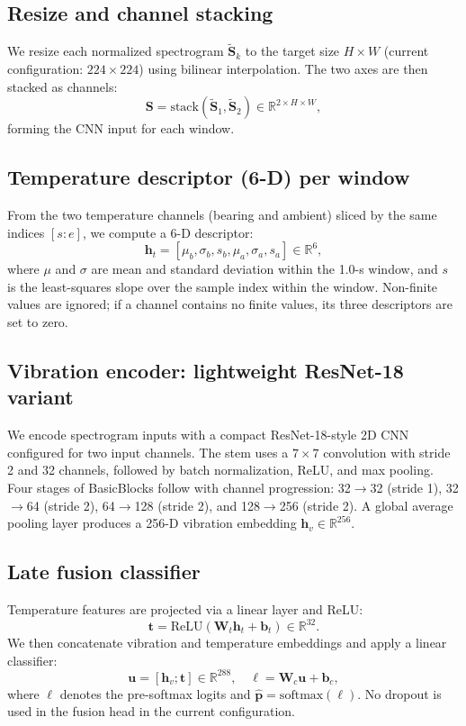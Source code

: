 \documentclass{article}
\begin{document}
\subsection{Resize and channel stacking}
We resize each normalized spectrogram $\tilde{\mathbf{S}}_k$ to the target size $H\times W$ (current configuration: $224\times224$) using bilinear interpolation. The two axes are then stacked as channels:
\begin{equation}
\mathbf{S}=\mathrm{stack}(\tilde{\mathbf{S}}_1,\tilde{\mathbf{S}}_2)\in\mathbb{R}^{2\times H \times W},
\end{equation}
forming the CNN input for each window.

\subsection{Temperature descriptor (6-D) per window}
From the two temperature channels (bearing and ambient) sliced by the same indices $[s:e]$, we compute a 6-D descriptor:
\begin{equation}
\mathbf{h}_t = [\mu_b, \sigma_b, s_b, \mu_a, \sigma_a, s_a]\in\mathbb{R}^{6},
\end{equation}
where $\mu$ and $\sigma$ are mean and standard deviation within the 1.0-s window, and $s$ is the least-squares slope over the sample index within the window. Non-finite values are ignored; if a channel contains no finite values, its three descriptors are set to zero.

\subsection{Vibration encoder: lightweight ResNet-18 variant}
We encode spectrogram inputs with a compact ResNet-18-style 2D CNN configured for two input channels. The stem uses a $7\times7$ convolution with stride 2 and 32 channels, followed by batch normalization, ReLU, and max pooling. Four stages of BasicBlocks follow with channel progression:
32$\rightarrow$32 (stride 1), 32$\rightarrow$64 (stride 2), 64$\rightarrow$128 (stride 2), and 128$\rightarrow$256 (stride 2). A global average pooling layer produces a 256-D vibration embedding $\mathbf{h}_v\in\mathbb{R}^{256}$.

\subsection{Late fusion classifier}
Temperature features are projected via a linear layer and ReLU:
\begin{equation}
\mathbf{t} = \mathrm{ReLU}(\mathbf{W}_t \mathbf{h}_t + \mathbf{b}_t)\in\mathbb{R}^{32}.
\end{equation}
We then concatenate vibration and temperature embeddings and apply a linear classifier:
\begin{equation}
\mathbf{u} = [\mathbf{h}_v;\mathbf{t}] \in \mathbb{R}^{288},\quad
\boldsymbol{\ell} = \mathbf{W}_c \mathbf{u} + \mathbf{b}_c,
\end{equation}
where $\boldsymbol{\ell}$ denotes the pre-softmax logits and $\hat{\mathbf{p}}=\mathrm{softmax}(\boldsymbol{\ell})$.
No dropout is used in the fusion head in the current configuration.
\end{document}

